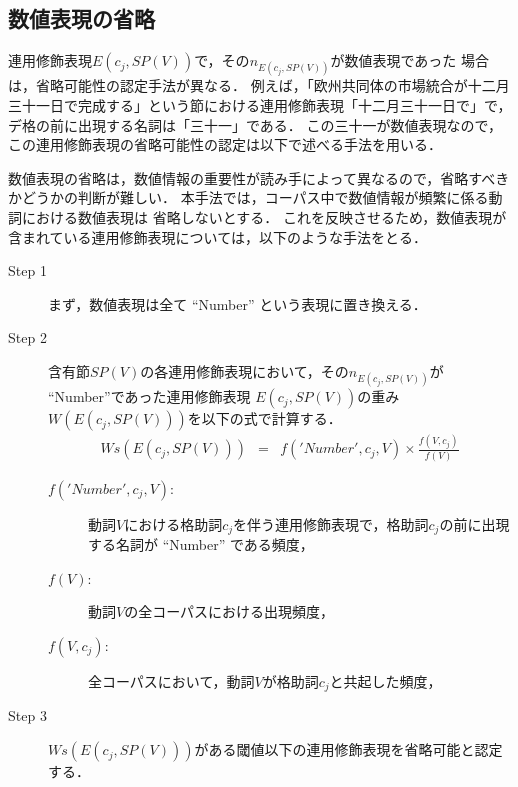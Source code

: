 \subsection{数値表現の省略}
連用修飾表現$E(c_{j},SP(V))$で，その$n_{E(c_{j},SP(V))}$が数値表現であった
場合は，省略可能性の認定手法が異なる．
例えば，「欧州共同体の市場統合が十二月三十一日で完成する」という節における連用修飾表現「十二月三十一日で」で，デ格の前に出現する名詞は「三十一」である．
この三十一が数値表現なので，この連用修飾表現の省略可能性の認定は以下で述べる手法を用いる．

数値表現の省略は，数値情報の重要性が読み手によって異なるので，省略すべきかどうかの判断が難しい．
本手法では，コーパス中で数値情報が頻繁に係る動詞における数値表現は
省略しないとする．
これを反映させるため，数値表現が含まれている連用修飾表現については，以下のような手法をとる．
\begin{description}
  \item[Step 1] まず，数値表現は全て ``Number'' という表現に置き換える．
  \item[Step 2] 含有節$SP(V)$の各連用修飾表現において，その$n_{E(c_{j},SP(V))}$が
``Number''であった連用修飾表現
$E(c_{j},SP(V))$の重み$W(E(c_{j},SP(V)))$を以下の式で計算する．
\begin{eqnarray}
Ws(E(c_{j},SP(V))) &=& f('Number',c_{j},V) \times \frac{f(V,c_{j})}{f(V)} 
\end{eqnarray}
\begin{description} 
  \item[$f('Number',c_{j},V)$:] 動詞$V$における格助詞$c_{j}$を伴う連用修飾表現で，格助詞$c_{j}$の前に出現する名詞が ``Number'' である頻度，
  \item[$f(V)$:] 動詞$V$の全コーパスにおける出現頻度，
  \item[$f(V,c_{j})$:] 全コーパスにおいて，動詞$V$が格助詞$c_{j}$と共起した頻度，
\end{description}
  \item[Step 3] $Ws(E(c_{j},SP(V)))$がある閾値以下の連用修飾表現を省略可能と認定する．
\end{description}
